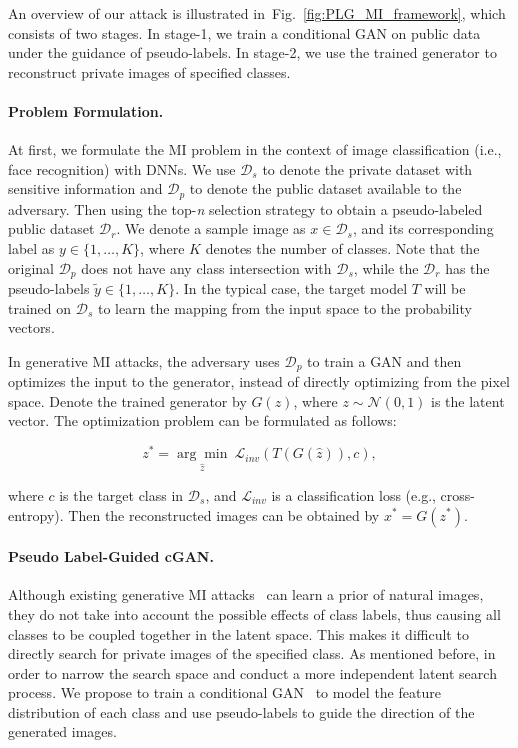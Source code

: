 \documentclass[letterpaper]{article} %
\newcommand{\Fref}[1]{Fig.~\ref{#1}}
\begin{document}
An overview of our attack is illustrated in~\Fref{fig:PLG_MI_framework}, which consists of two stages. In stage-1, we train a conditional GAN on public data under the guidance of pseudo-labels. In stage-2, we use the trained generator to reconstruct private images of specified classes. 
	
\paragraph{Problem Formulation.} 
At first, we formulate the MI problem in the context of image classification (i.e., face recognition) with DNNs. We use $\mathcal{D}_{s}$ to denote the private dataset with sensitive information and $\mathcal{D}_{p}$ to denote the public dataset available to the adversary. Then using the top-\emph{n} selection strategy to obtain a pseudo-labeled public dataset $\mathcal{D}_{r}$. We denote a sample image as $x \in \mathcal{D}_s$, and its corresponding label as $y \in \{1,\dots,K\}$, where $K$ denotes the number of classes. Note that the original $\mathcal{D}_{p}$ does not have any class intersection with $\mathcal{D}_{s}$, while the $\mathcal{D}_{r}$ has the pseudo-labels $\tilde{y} \in \{1,\dots,K\}$. In the typical case, the target model $T$ will be trained on $\mathcal{D}_{s}$ to learn the mapping from the input space to the probability vectors. 

In generative MI attacks, the adversary uses $\mathcal{D}_p$ to train a GAN and then optimizes the input to the generator, instead of directly optimizing from the pixel space. Denote the trained generator by $G(z)$, where $z \sim \mathcal{N}(0, 1)$ is the latent vector. The optimization problem can be formulated as follows:
\begin{linenomath*}
\begin{equation}\label{eq:GMI}
z^{*} = \underset{\hat{z}}{\arg \min} \ \mathcal{L}_{inv}(T(G(\hat{z})), c),
\end{equation}
\end{linenomath*}
where $c$ is the target class in $\mathcal{D}_{s}$, and $\mathcal{L}_{inv}$ is a classification loss (e.g., cross-entropy). Then the reconstructed images can be obtained by $x^{*} = G(z^{*})$. 

   

 
\paragraph{Pseudo Label-Guided cGAN.}
Although existing generative MI attacks~\cite{zhang2020secret, chen2021knowledge} can learn a prior of natural images, they do not take into account the possible effects of class labels, thus causing all classes to be coupled together in the latent space. This makes it difficult to directly search for private images of the specified class. As mentioned before, in order to narrow the search space and conduct a more independent latent search process. We propose to train a conditional GAN~\cite{miyato2018cgans} to model the feature distribution of each class and use pseudo-labels to guide the direction of the generated images. 
\end{document}
